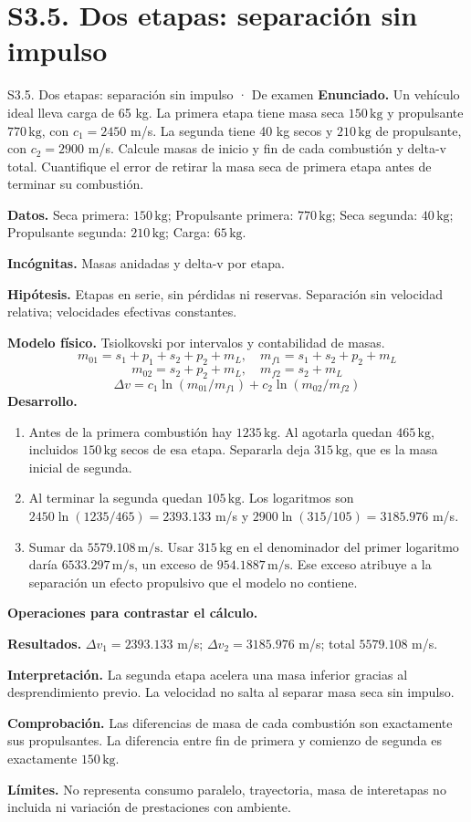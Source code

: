 \section{S3.5. Dos etapas: separación sin impulso}
\begin{studiumworked}{S3.5. Dos etapas: separación sin impulso · De examen}
\textbf{Enunciado.} Un vehículo ideal lleva carga de 65 kg. La primera etapa tiene masa seca $150\,\mathrm{kg}$ y propulsante $770\,\mathrm{kg}$, con $c_1=2450$ m/s. La segunda tiene 40 kg secos y $210\,\mathrm{kg}$ de propulsante, con $c_2=2900$ m/s. Calcule masas de inicio y fin de cada combustión y delta-v total. Cuantifique el error de retirar la masa seca de primera etapa antes de terminar su combustión.

\textbf{Datos.} Seca primera: $150\,\mathrm{kg}$; Propulsante primera: $770\,\mathrm{kg}$; Seca segunda: $40\,\mathrm{kg}$; Propulsante segunda: $210\,\mathrm{kg}$; Carga: $65\,\mathrm{kg}$.

\textbf{Incógnitas.} Masas anidadas y delta-v por etapa.

\textbf{Hipótesis.} Etapas en serie, sin pérdidas ni reservas. Separación sin velocidad relativa; velocidades efectivas constantes.

\textbf{Modelo físico.} Tsiolkovski por intervalos y contabilidad de masas.
\[m_{01}=s_1+p_1+s_2+p_2+m_L,\quad m_{f1}=s_1+s_2+p_2+m_L\]
\[m_{02}=s_2+p_2+m_L,\quad m_{f2}=s_2+m_L\]
\[\Delta v=c_1\ln(m_{01}/m_{f1})+c_2\ln(m_{02}/m_{f2})\]
\textbf{Desarrollo.}
\begin{enumerate}
\item Antes de la primera combustión hay $1235\,\mathrm{kg}$. Al agotarla quedan $465\,\mathrm{kg}$, incluidos $150\,\mathrm{kg}$ secos de esa etapa. Separarla deja $315\,\mathrm{kg}$, que es la masa inicial de segunda.
\item Al terminar la segunda quedan $105\,\mathrm{kg}$. Los logaritmos son $2450\ln(1235/465)=2393.133$ m/s y $2900\ln(315/105)=3185.976$ m/s.
\item Sumar da $5579.108\,\mathrm{m/s}$. Usar $315\,\mathrm{kg}$ en el denominador del primer logaritmo daría $6533.297\,\mathrm{m/s}$, un exceso de $954.1887\,\mathrm{m/s}$. Ese exceso atribuye a la separación un efecto propulsivo que el modelo no contiene.
\end{enumerate}
\textbf{Operaciones para contrastar el cálculo.}

\textbf{Resultados.} $\Delta v_1=2393.133$ m/s; $\Delta v_2=3185.976$ m/s; total $5579.108$ m/s.

\textbf{Interpretación.} La segunda etapa acelera una masa inferior gracias al desprendimiento previo. La velocidad no salta al separar masa seca sin impulso.

\textbf{Comprobación.} Las diferencias de masa de cada combustión son exactamente sus propulsantes. La diferencia entre fin de primera y comienzo de segunda es exactamente $150\,\mathrm{kg}$.

\textbf{Límites.} No representa consumo paralelo, trayectoria, masa de interetapas no incluida ni variación de prestaciones con ambiente.
\end{studiumworked}

